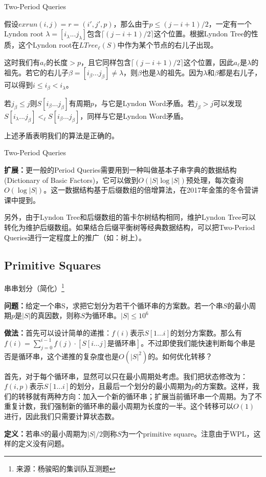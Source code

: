 \documentclass{beamer}
\begin{document}
\begin{frame}{Two-Period Queries}
	\par 假设$exrun(i,j)=r=(i',j',p)$，那么由于$p\leq(j-i+1)/2$，一定有一个Lyndon root $\lambda=[i_{\lambda}...j_{\lambda}]$包含$\lceil(j-i+1)/2\rceil$这个位置。根据Lyndon Tree的性质，这个Lyndon root在$LTree_{\ell}(S)$中作为某个节点的右儿子出现。
	\pause
	\par 这时我们有$a_{\ell}$的长度$>p$，且它同样包含$\lceil(j-i+1)/2\rceil$这个位置，因此$a_{\ell}$是$\lambda$的祖先。若它的右儿子$\beta=[i_{\beta}...j_{\beta}]\neq\lambda$，则$\beta$也是$\lambda$的祖先。因为$\lambda$和$\beta$都是右儿子，可以得到$i\leq i_{\beta}<i_{\lambda}$。
	\pause
	\par 若$j_{\beta}\le j$则$S[i_{\beta}...j_{\beta}]$有周期$p$，与它是Lyndon Word矛盾。若$j_{\beta}>j$可以发现$S[i_{\lambda}...j_{\beta}]<_{\ell}S[i_{\beta}...j_{\beta}]$，同样与它是Lyndon Word矛盾。
	\par 上述矛盾表明我们的算法是正确的。
\end{frame}

\begin{frame}{Two-Period Queries}
	\par \textbf{扩展：}更一般的Period Queries需要用到一种叫做基本子串字典的数据结构(Dictionary of Basic Factors)，它可以做到$O(|S|\log|S|)$预处理，每次查询$O(\log|S|)$。这一数据结构基于后缀数组的倍增算法，在2017年金策的冬令营讲课中提到。
	\pause
	\par 另外，由于Lyndon Tree和后缀数组的笛卡尔树结构相同，维护Lyndon Tree可以转化为维护后缀数组。如果结合后缀平衡树等经典数据结构，可以把Two-Period Queries进行一定程度上的推广（如：树上）。
\end{frame}

\subsection{Primitive Squares}

\begin{frame}{串串划分（简化）\footnote{来源：杨骏昭的集训队互测题}}
	\par \textbf{问题：}给定一个串S，求把它划分为若干个循环串的方案数。若一个串$S$的最小周期$p$是$|S|$的真因数，则称$S$为循环串。$|S|\le10^6$
	\pause
	\par \textbf{做法：}首先可以设计简单的递推：$f(i)$表示$S[1...i]$的划分方案数。那么有$f(i)=\sum_{j=0}^{i-1}f(j)\cdot[S[i...j]\texttt{是循环串}]$。不过即使我们能快速判断每个串是否是循环串，这个递推的复杂度也是$O(|S|^2)$的。如何优化转移？
	\pause
	\par 首先，对于每个循环串，显然可以只在最小周期处考虑。我们把状态修改为：$f(i,p)$表示$S[1...i]$的划分，且最后一个划分的最小周期为$p$的方案数。这样，我们的转移就有两种方向：加入一个新的循环串；扩展当前循环串一个周期。为了不重复计数，我们强制新的循环串的最小周期为长度的一半。这个转移可以$O(1)$进行，因此我们只需要计算状态数。
	\pause
	\par \textbf{定义：}若串$S$的最小周期为$|S|/2$则称$S$为一个primitive square。注意由于WPL，这样的定义没有问题。
\end{frame}
\end{document}
